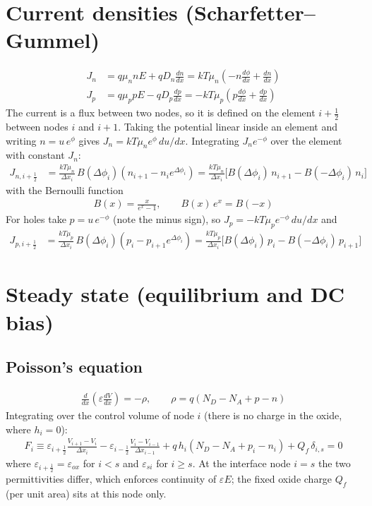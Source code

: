 \documentclass[11pt]{article}
\newcommand{\dphi}[1]{\Delta\phi_{#1}}
\newcommand{\half}{\tfrac{1}{2}}
\begin{document}
\section{Current densities (Scharfetter--Gummel)}
\begin{align}
J_n &= q\mu_n nE + qD_n\frac{dn}{dx} = kT\mu_n\left(-n\frac{d\phi}{dx}+\frac{dn}{dx}\right)\\
J_p &= q\mu_p pE - qD_p\frac{dp}{dx} = -kT\mu_p\left(p\frac{d\phi}{dx}+\frac{dp}{dx}\right)
\end{align}
The current is a flux between two nodes, so it is defined on the element $i+\half$ between nodes $i$ and
$i+1$. Taking the potential linear inside an element and writing $n=u\,e^{\phi}$ gives
$J_n = kT\mu_n e^{\phi}\,du/dx$. Integrating $J_n e^{-\phi}$ over the element with constant $J_n$:
\begin{align}
J_{n,i+\half} &= \frac{kT\mu_n}{\Delta x_i}\,B(\dphi{i})\left(n_{i+1}-n_i e^{\dphi{i}}\right)
= \frac{kT\mu_n}{\Delta x_i}\Big[B(\dphi{i})\,n_{i+1}-B(-\dphi{i})\,n_i\Big] \label{eq:jn}
\end{align}
with the Bernoulli function
\begin{align}
B(x)=\frac{x}{e^{x}-1}, \qquad B(x)\,e^{x}=B(-x)
\end{align}
For holes take $p=u\,e^{-\phi}$ (note the minus sign), so $J_p=-kT\mu_p e^{-\phi}\,du/dx$ and
\begin{align}
J_{p,i+\half} &= \frac{kT\mu_p}{\Delta x_i}\,B(\dphi{i})\left(p_i-p_{i+1}e^{\dphi{i}}\right)
= \frac{kT\mu_p}{\Delta x_i}\Big[B(\dphi{i})\,p_i-B(-\dphi{i})\,p_{i+1}\Big] \label{eq:jp}
\end{align}

\section{Steady state (equilibrium and DC bias)}
\subsection{Poisson's equation}
\begin{align}
\frac{d}{dx}\left(\varepsilon\frac{dV}{dx}\right) = -\rho, \qquad \rho = q\left(N_D-N_A+p-n\right)
\end{align}
Integrating over the control volume of node $i$ (there is no charge in the oxide, where $h_i=0$):
\begin{align}
F_i \equiv \varepsilon_{i+\half}\frac{V_{i+1}-V_i}{\Delta x_i}-\varepsilon_{i-\half}\frac{V_i-V_{i-1}}{\Delta x_{i-1}}
+q\,h_i\left(N_D-N_A+p_i-n_i\right)+Q_f\,\delta_{i,s}=0 \label{eq:poisson}
\end{align}
where $\varepsilon_{i+\half}=\varepsilon_{ox}$ for $i<s$ and $\varepsilon_{si}$ for $i\ge s$. At the interface
node $i=s$ the two permittivities differ, which enforces continuity of $\varepsilon E$; the fixed oxide
charge $Q_f$ (per unit area) sits at this node only.
\end{document}
